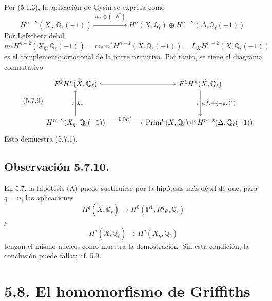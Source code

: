 Por (5.1.3), la aplicación de Gysin se expresa como
\begin{equation}\tag{5.7.8}
H^{n-2}(X_{\bar\eta},\mathbb Q_\ell(-1))
\xrightarrow{\;m_*\oplus(-h^*)\;}
H^n(X,\mathbb Q_\ell)
\oplus H^{n-2}(\Delta,\mathbb Q_\ell(-1)).
\end{equation}
Por Lefschetz débil,
\[
m_*H^{n-2}(X_{\bar\eta},\mathbb Q_\ell(-1))
=m_*m^*H^{n-2}(X,\mathbb Q_\ell(-1))
=L_XH^{n-2}(X,\mathbb Q_\ell(-1))
\]
es el complemento ortogonal de la parte primitiva. Por tanto, se tiene
el diagrama conmutativo
\begin{equation}\tag{5.7.9}
\begin{tikzcd}[column sep=huge,row sep=huge]
F^2H^n(\widetilde X,\mathbb Q_\ell)
  \arrow[r,hook]
& F^1H^n(\widetilde X,\mathbb Q_\ell)
  \arrow[d,"\wp f_*\oplus(-g_*i^*)","\wr"']
\\
H^{n-2}(X_{\bar\eta},\mathbb Q_\ell(-1))
  \arrow[u,"k_*"',"\wr"]
  \arrow[r,"0\oplus h^*"]
& \operatorname{Prim}^n(X,\mathbb Q_\ell)
  \oplus H^{n-2}(\Delta,\mathbb Q_\ell(-1)).
\end{tikzcd}
\end{equation}
Esto demuestra (5.7.1).

\pageoriginale

\subsection*{Observación 5.7.10.}
En 5.7, la hipótesis (A) puede sustituirse por la hipótesis más débil
de que, para $q=n$, las aplicaciones
\begin{equation}\tag{5.7.11}
H^q(\widetilde X,\mathbb Q_\ell)\longrightarrow
H^0(\mathbb P^1,R^q\rho_*\mathbb Q_\ell)
\end{equation}
y
\begin{equation}\tag{5.7.12}
H^q(\widetilde X,\mathbb Q_\ell)\longrightarrow
H^q(X_{\bar\eta},\mathbb Q_\ell)
\end{equation}
tengan el mismo núcleo, como muestra la demostración. Sin esta
condición, la conclusión puede fallar; cf. 5.9.

\section*{5.8. El homomorfismo de Griffiths}

